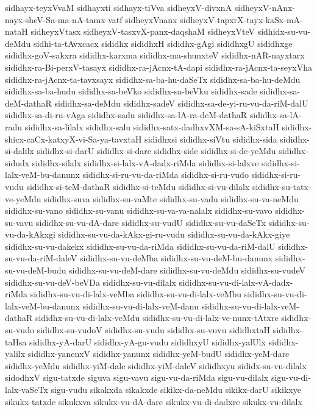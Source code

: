 {sidhayx-teyxVvaM
sidhayxti
sidhayx-tiVva
sidheyxV-divxnA
sidheyxV-nAnx-nayx-sheV-Sa-ma-nA-tamx-vatf
sidheyxVnanx
sidheyxV-tapxrX-tayx-kaSx-mA-nataH
sidheyxVtasx
sidheyxV-tasxvX-panx-daqshaM
sidheyxVteV
sidhidx-su-vu-deMdu
sidhi-ta-tAvxcacx
sididhx
sididhxH
sididhx-gAgi
sididhxgU
sididhxge
sididhx-goV-sakxra
sididhx-karxma
sididhx-ma-shunxteV
sididhx-nAR-nayxtarx
sididhx-ra-Bi-perxV-tasayx
sididhx-ra-jAcnx-tA-dapi
sididhx-ra-jAcnx-ta-seyxVha
sididhx-ra-jAcnx-ta-tavxsayx
sididhx-sa-ba-hu-daSeTx
sididhx-sa-ba-hu-deMdu
sididhx-sa-ba-hudu
sididhx-sa-beVko
sididhx-sa-beVku
sididhx-sade
sididhx-sa-deM-dathaR
sididhx-sa-deMdu
sididhx-sadeV
sididhx-sa-de-yi-ru-vu-da-riM-dalU
sididhx-sa-di-ru-vAga
sididhx-sadu
sididhx-sa-lA-ra-deM-dathaR
sididhx-sa-lA-radu
sididhx-sa-lilalx
sididhx-salu
sididhx-satx-dadhxvXM-sa-sA-kiSxtaH
sididhx-shicx-caCx-katxyX-vi-Sa-ya-tavxtaH
sididhxsi
sididhx-siVtu
sididhx-sida
sididhx-si-dalilx
sididhx-si-darU
sididhx-si-dare
sididhx-side
sididhx-si-de-yeMdu
sididhx-sidudx
sididhx-silalx
sididhx-si-lalx-vA-dadx-riMda
sididhx-si-lalxve
sididhx-si-lalx-veM-bu-danunx
sididhx-si-ru-vu-da-riMda
sididhx-si-ru-vudo
sididhx-si-ru-vudu
sididhx-si-teM-dathaR
sididhx-si-teMdu
sididhx-si-vu-dilalx
sididhx-su-tatx-ve-yeMdu
sididhx-suva
sididhx-su-vaMte
sididhx-su-vadu
sididhx-su-va-neMdu
sididhx-su-vano
sididhx-su-vanu
sididhx-su-va-va-nalalx
sididhx-su-vavo
sididhx-su-vavu
sididhx-su-vu-dA-dare
sididhx-su-vudU
sididhx-su-vu-daSeTx
sididhx-su-vu-da-kAkxgi
sididhx-su-vu-da-kAkx-gi-ru-vudu
sididhx-su-vu-da-kAkx-giye
sididhx-su-vu-dakekx
sididhx-su-vu-da-riMda
sididhx-su-vu-da-riM-dalU
sididhx-su-vu-da-riM-daleV
sididhx-su-vu-deMba
sididhx-su-vu-deM-bu-danunx
sididhx-su-vu-deM-budu
sididhx-su-vu-deM-dare
sididhx-su-vu-deMdu
sididhx-su-vudeV
sididhx-su-vu-deV-beVDa
sididhx-su-vu-dilalx
sididhx-su-vu-di-lalx-vA-dadx-riMda
sididhx-su-vu-di-lalx-veMba
sididhx-su-vu-di-lalx-veMbu
sididhx-su-vu-di-lalx-veM-bu-danunx
sididhx-su-vu-di-lalx-veM-danu
sididhx-su-vu-di-lalx-veM-dathaR
sididhx-su-vu-di-lalx-veMdu
sididhx-su-vu-di-lalx-ve-nunx-tAtxre
sididhx-su-vudo
sididhx-su-vudoV
sididhx-su-vudu
sididhx-su-vuvu
sididhxtaH
sididhx-taHsa
sididhx-yA-darU
sididhx-yA-gu-vudu
sididhxyU
sididhx-yalUlx
sididhx-yalilx
sididhx-yanenxV
sididhx-yanunx
sididhx-yeM-budU
sididhx-yeM-dare
sididhx-yeMdu
sididhx-yiM-dale
sididhx-yiM-daleV
sididhxyu
sididx-su-vu-dilalx
sidodhxV
sigu-tatxde
siguva
sigu-vavu
sigu-vu-da-riMda
sigu-vu-dilalx
sigu-vu-di-lalx-vaSeTx
sigu-vudu
sikakxda
sikakxde
sikikx-da-neMdu
sikikx-darU
sikikxye
sikukx-tatxde
sikukxva
sikukx-vu-dA-dare
sikukx-vu-di-dadxre
sikukx-vu-dilalx
}
